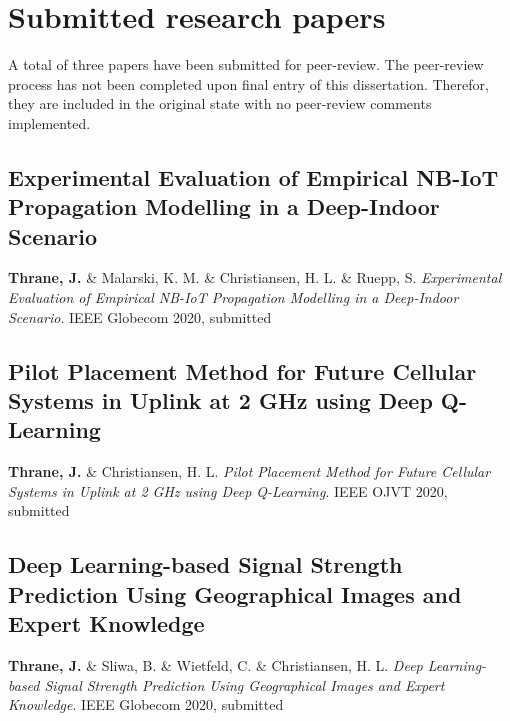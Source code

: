\chapter{Submitted research papers}\label{app:submitted_papers}

A total of three papers have been submitted for peer-review. The peer-review process has not been completed upon final entry of this dissertation. Therefor, they are included in the original state with no peer-review comments implemented.

\section{Experimental Evaluation of Empirical NB-IoT Propagation Modelling in a Deep-Indoor Scenario}
\noindent \textbf{Thrane, J.} \&  Malarski, K. M. \& Christiansen, H. L. \& Ruepp, S. \textit{Experimental Evaluation of Empirical NB-IoT Propagation Modelling in a Deep-Indoor Scenario}. IEEE Globecom 2020, submitted \cite{Thrane2020ExperimentalScenario} 




\section{Pilot Placement Method for Future Cellular Systems in Uplink at 2 GHz using Deep Q-Learning}
\noindent \textbf{Thrane, J.} \& Christiansen, H. L. \textit{Pilot Placement Method for Future Cellular Systems in Uplink at 2 GHz using Deep Q-Learning}. IEEE OJVT 2020, submitted \cite{Thrane2020PilotQ-Learning} 





\section{Deep Learning-based Signal Strength Prediction Using Geographical Images and Expert Knowledge}
\noindent \textbf{Thrane, J.} \&  Sliwa, B. \& Wietfeld, C. \& Christiansen, H. L. \textit{Deep Learning-based Signal Strength Prediction Using Geographical Images and Expert Knowledge}. IEEE Globecom 2020, submitted \cite{Thrane2020DeepKnowledge}

